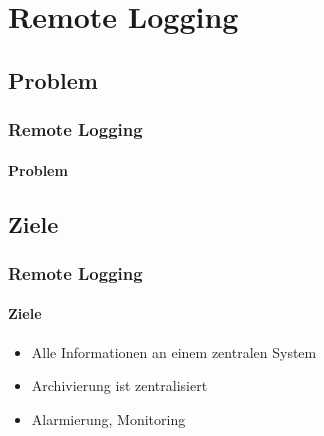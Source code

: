\section{Remote Logging}
\subsection{Problem}
\begin{frame}[partpage]
	\frametitle{Remote Logging}
	\framesubtitle{Problem}
\end{frame}

\subsection{Ziele}
\begin{frame}
	\frametitle{Remote Logging}
	\framesubtitle{Ziele}
	\begin{itemize}
		\item Alle Informationen an einem zentralen System
		\item Archivierung ist zentralisiert
		\item Alarmierung, Monitoring
	\end{itemize}
\end{frame}